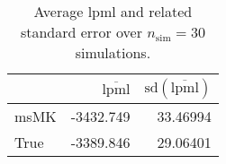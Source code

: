 \begin{table}[H]

\caption{Average lpml and related standard error over $n_{\text{sim}} = 30$ simulations.}
\centering
\begin{tabular}[t]{lrr}
\toprule
  & $\overbar{\text{lpml}}$ & $\text{sd}(\overbar{\text{lpml}})$\\
\midrule
msMK & -3432.749 & 33.46994\\
True & -3389.846 & 29.06401\\
\bottomrule
\end{tabular}
\end{table}